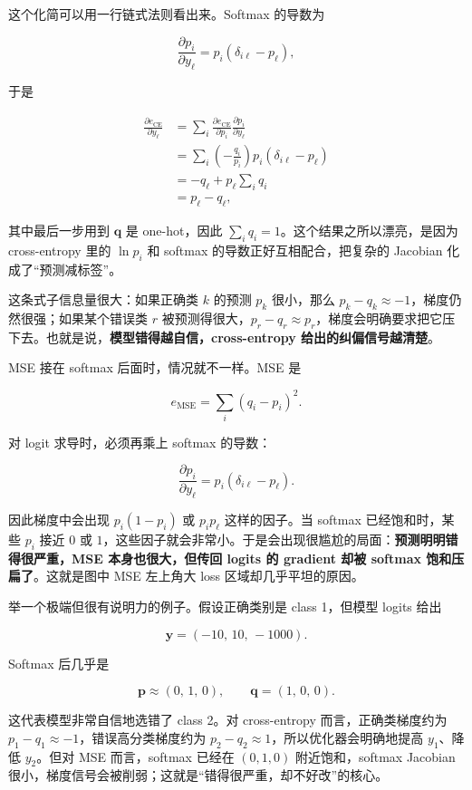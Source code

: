 \documentclass[a4paper]{article}
\begin{document}
这个化简可以用一行链式法则看出来。Softmax 的导数为

\[
    \frac{\partial p_i}{\partial y_\ell}
    = p_i(\delta_{i\ell}-p_\ell),
\]

于是

\begin{align*}
    \frac{\partial e_{\text{CE}}}{\partial y_\ell}
    &= \sum_i \frac{\partial e_{\text{CE}}}{\partial p_i}
       \frac{\partial p_i}{\partial y_\ell} \\
    &= \sum_i \left(-\frac{q_i}{p_i}\right)
       p_i(\delta_{i\ell}-p_\ell) \\
    &= -q_\ell + p_\ell\sum_i q_i \\
    &= p_\ell-q_\ell,
\end{align*}

其中最后一步用到 $\boldsymbol{q}$ 是 one-hot，因此 $\sum_i q_i=1$。这个结果之所以漂亮，是因为 cross-entropy 里的 $\ln p_i$ 和 softmax 的导数正好互相配合，把复杂的 Jacobian 化成了``预测减标签''。

这条式子信息量很大：如果正确类 $k$ 的预测 $p_k$ 很小，那么 $p_k-q_k\approx -1$，梯度仍然很强；如果某个错误类 $r$ 被预测得很大，$p_r-q_r\approx p_r$，梯度会明确要求把它压下去。也就是说，\textbf{模型错得越自信，cross-entropy 给出的纠偏信号越清楚}。

MSE 接在 softmax 后面时，情况就不一样。MSE 是

\[
    e_{\text{MSE}}=\sum_i(q_i-p_i)^2.
\]

对 logit 求导时，必须再乘上 softmax 的导数：

\[
    \frac{\partial p_i}{\partial y_\ell}
    = p_i(\delta_{i\ell}-p_\ell).
\]

因此梯度中会出现 $p_i(1-p_i)$ 或 $p_ip_\ell$ 这样的因子。当 softmax 已经饱和时，某些 $p_i$ 接近 $0$ 或 $1$，这些因子就会非常小。于是会出现很尴尬的局面：\textbf{预测明明错得很严重，MSE 本身也很大，但传回 logits 的 gradient 却被 softmax 饱和压扁了}。这就是图中 MSE 左上角大 loss 区域却几乎平坦的原因。

举一个极端但很有说明力的例子。假设正确类别是 class 1，但模型 logits 给出

\[
    \boldsymbol{y}=(-10,\,10,\,-1000).
\]

Softmax 后几乎是

\[
    \boldsymbol{p}\approx(0,\,1,\,0),\qquad
    \boldsymbol{q}=(1,\,0,\,0).
\]

这代表模型非常自信地选错了 class 2。对 cross-entropy 而言，正确类梯度约为 $p_1-q_1\approx -1$，错误高分类梯度约为 $p_2-q_2\approx 1$，所以优化器会明确地提高 $y_1$、降低 $y_2$。但对 MSE 而言，softmax 已经在 $(0,1,0)$ 附近饱和，softmax Jacobian 很小，梯度信号会被削弱；这就是``错得很严重，却不好改''的核心。
\end{document}

